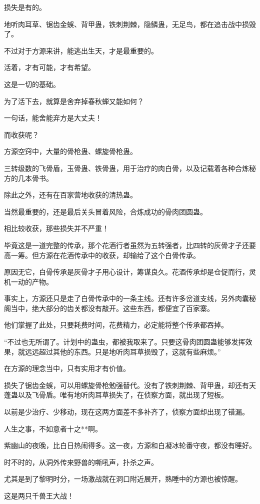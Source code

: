 \begin{this_body}
损失是有的。

地听肉耳草、锯齿金蜈、背甲蛊，铁刺荆棘，隐鳞蛊，无足鸟，都在追击战中损毁了。

不过对于方源来讲，能逃出生天，才是最重要的。

活着，才有可能，才有希望。

这是一切的基础。

为了活下去，就算是舍弃掉春秋蝉又能如何？

一句话，能舍能弃方是大丈夫！

而收获呢？

方源空窍中，大量的骨枪蛊、螺旋骨枪蛊。

三转级数的飞骨盾，玉骨蛊、铁骨蛊，用于治疗的肉白骨，以及记载着各种合炼秘方的几本骨书。

除此之外，还有在百家营地收获的清热蛊。

当然最重要的，还是最后关头冒着风险，合炼成功的骨肉团圆蛊。

相比较收获，那些损失并不严重！

毕竟这是一道完整的传承，那个花酒行者虽然为五转强者，比四转的灰骨才子还要高一筹。但方源在花酒传承中的收获，却输给了这个白骨传承。

原因无它，白骨传承是灰骨才子用心设计，筹谋良久。花酒传承却是仓促而行，灵机一动的产物。

事实上，方源还只是走了白骨传承中的一条主线。还有许多岔道支线，另外肉囊秘阁当中，绝大部分的齿关都没有敲开。这些东西，都便宜了百家寨。

他们掌握了此处，只要耗费时间，花费精力，必定能将整个传承都吞掉。

“不过也无所谓了。计划中的蛊虫，都被我取来了。只要这骨肉团圆蛊能够发挥效果，就远远超过其他的东西。只是地听肉耳草损毁了，这就有些麻烦。”

在方源的理念当中，只有实用才有价值。

损失了锯齿金蜈，可以用螺旋骨枪勉强替代。没有了铁刺荆棘、背甲蛊，却还有天蓬蛊以及飞骨盾。唯有地听肉耳草损失了，在侦察方面，就出现了短板。

以前是少治疗、少移动，现在这两方面差不多补齐了，侦察方面却出现了错漏。

人生之事，不如意者十之**啊。

紫幽山的夜晚，比白日热闹得多。这一夜，方源和白凝冰轮番守夜，都没有睡好。

时不时的，从洞外传来野兽的嘶吼声，扑杀之声。

尤其是到了黎明时分，一场激战就在洞口附近展开，熟睡中的方源也被惊醒。

这是两只千兽王大战！


\end{this_body}
